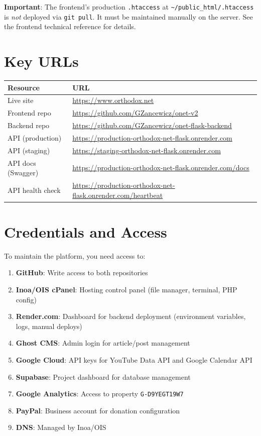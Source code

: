 \documentclass[12pt]{article}
\begin{document}
\textbf{Important}: The frontend's production \texttt{.htaccess} at \texttt{\textasciitilde/public\_html/.htaccess} is \emph{not} deployed via \texttt{git pull}. It must be maintained manually on the server. See the frontend technical reference for details.

\section{Key URLs}

\begin{longtable}{p{3.5cm}p{9cm}}
\toprule
\textbf{Resource} & \textbf{URL} \\
\midrule
Live site & \url{https://www.orthodox.net} \\
Frontend repo & \url{https://github.com/GZancewicz/onet-v2} \\
Backend repo & \url{https://github.com/GZancewicz/onet-flask-backend} \\
API (production) & \url{https://production-orthodox-net-flask.onrender.com} \\
API (staging) & \url{https://staging-orthodox-net-flask.onrender.com} \\
API docs (Swagger) & \url{https://production-orthodox-net-flask.onrender.com/docs} \\
API health check & \url{https://production-orthodox-net-flask.onrender.com/heartbeat} \\
\bottomrule
\end{longtable}

\section{Credentials and Access}

To maintain the platform, you need access to:

\begin{enumerate}
    \item \textbf{GitHub}: Write access to both repositories
    \item \textbf{Inoa/OIS cPanel}: Hosting control panel (file manager, terminal, PHP config)
    \item \textbf{Render.com}: Dashboard for backend deployment (environment variables, logs, manual deploys)
    \item \textbf{Ghost CMS}: Admin login for article/post management
    \item \textbf{Google Cloud}: API keys for YouTube Data API and Google Calendar API
    \item \textbf{Supabase}: Project dashboard for database management
    \item \textbf{Google Analytics}: Access to property \texttt{G-D9YEGT19W7}
    \item \textbf{PayPal}: Business account for donation configuration
    \item \textbf{DNS}: Managed by Inoa/OIS
\end{enumerate}
\end{document}
